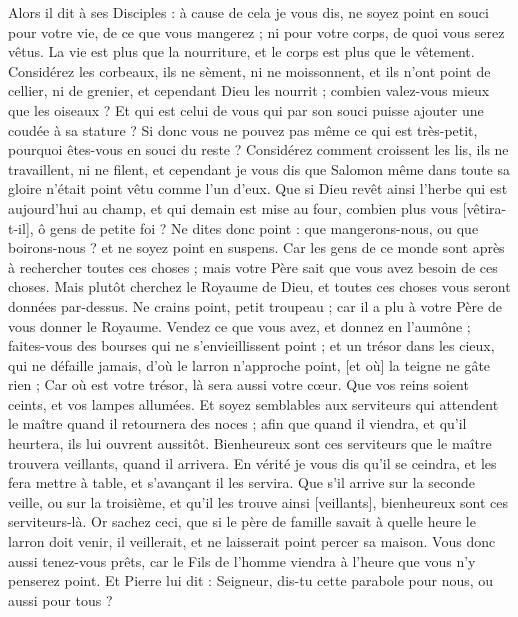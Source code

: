 \begin{multicols}{2}
Alors il dit à ses Disciples : à cause de cela je vous dis, ne soyez point en souci pour votre vie, de ce que vous mangerez ; ni pour votre corps, de quoi vous serez vêtus.
La vie est plus que la nourriture, et le corps est plus que le vêtement.
Considérez les corbeaux, ils ne sèment, ni ne moissonnent, et ils n'ont point de cellier, ni de grenier, et cependant Dieu les nourrit ; combien valez-vous mieux que les oiseaux ?
Et qui est celui de vous qui par son souci puisse ajouter une coudée à sa stature ?
Si donc vous ne pouvez pas même ce qui est très-petit, pourquoi êtes-vous en souci du reste ?
Considérez comment croissent les lis, ils ne travaillent, ni ne filent, et cependant je vous dis que Salomon même dans toute sa gloire n'était point vêtu comme l'un d'eux.
Que si Dieu revêt ainsi l'herbe qui est aujourd'hui au champ, et qui demain est mise au four, combien plus vous [vêtira-t-il], ô gens de petite foi ?
Ne dites donc point : que mangerons-nous, ou que boirons-nous ? et ne soyez point en suspens.
Car les gens de ce monde sont après à rechercher toutes ces choses ; mais votre Père sait que vous avez besoin de ces choses.
Mais plutôt cherchez le Royaume de Dieu, et toutes ces choses vous seront données par-dessus.
Ne crains point, petit troupeau ; car il a plu à votre Père de vous donner le Royaume.
Vendez ce que vous avez, et donnez en l'aumône ; faites-vous des bourses qui ne s'envieillissent point ; et un trésor dans les cieux, qui ne défaille jamais, d'où le larron n'approche point, [et où] la teigne ne gâte rien ;
Car où est votre trésor, là sera aussi votre cœur.
Que vos reins soient ceints, et vos lampes allumées.
Et soyez semblables aux serviteurs qui attendent le maître quand il retournera des noces ; afin que quand il viendra, et qu'il heurtera, ils lui ouvrent aussitôt.
Bienheureux sont ces serviteurs que le maître trouvera veillants, quand il arrivera. En vérité je vous dis qu'il se ceindra, et les fera mettre à table, et s'avançant il les servira.
Que s'il arrive sur la seconde veille, ou sur la troisième, et qu'il les trouve ainsi [veillants], bienheureux sont ces serviteurs-là.
Or sachez ceci, que si le père de famille savait à quelle heure le larron doit venir, il veillerait, et ne laisserait point percer sa maison.
Vous donc aussi tenez-vous prêts, car le Fils de l'homme viendra à l'heure que vous n'y penserez point.
Et Pierre lui dit : Seigneur, dis-tu cette parabole pour nous, ou aussi pour tous ?

\end{multicols}
